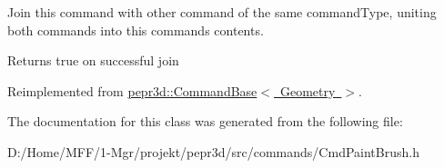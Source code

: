 Join this command with other command of the same command\+Type, uniting both commands into this command\textquotesingle{}s contents. 

\begin{DoxyReturn}{Returns}
true on successful join 
\end{DoxyReturn}


Reimplemented from \mbox{\hyperlink{classpepr3d_1_1_command_base_a9ef408154b7cb446e626e049f268abb4}{pepr3d\+::\+Command\+Base$<$ Geometry $>$}}.



The documentation for this class was generated from the following file\+:\begin{DoxyCompactItemize}
\item 
D\+:/\+Home/\+M\+F\+F/1-\/\+Mgr/projekt/pepr3d/src/commands/Cmd\+Paint\+Brush.\+h\end{DoxyCompactItemize}
